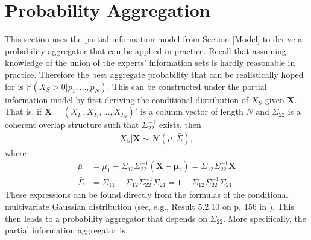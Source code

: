 \documentclass[11pt]{article}
\renewcommand{\P}{\mathbb{P}}
\theoremstyle{definition}
\theoremstyle{definition}
\begin{document}
%
%




\section{Probability Aggregation}
This section uses the partial information model from Section \ref{Model} to derive a probability aggregator that can be applied in practice. Recall that assuming knowledge of the union of the experts' information sets is hardly reasonable in practice. Therefore the best aggregate probability that can be realistically hoped for is  $\P(X_{S} > 0 | p_1, \dots, p_N)$.  This can be constructed under the partial information model by first deriving the conditional distribution of $X_S$ given $\boldsymbol{X}$. That is, if $\boldsymbol{X} = (X_{I_1}, X_{I_2},  \dots, X_{I_N})'$ is a column vector of length $N$ and $\Sigma_{22}$ is a coherent overlap structure such that $\Sigma_{22}^{-1}$ exists, then 
\begin{align*}
X_{S} | \boldsymbol{X} \sim \mathcal{N}(\bar{\mu}, \bar{\Sigma}), 
\end{align*}
where
\begin{align}
\bar{\mu} &= \mu_1 + \Sigma_{12} \Sigma_{22}^{-1} (\boldsymbol{X} - \boldsymbol{\mu}_2) =  \Sigma_{12} \Sigma_{22}^{-1} \boldsymbol{X} \label{condMu}\\
 \bar{\Sigma}&= \Sigma_{11} - \Sigma_{12} \Sigma_{22}^{-1} \Sigma_{21} =1 - \Sigma_{12} \Sigma_{22}^{-1} \Sigma_{21}  \label{condSigma}
\end{align}
These expressions can be found directly from the formulas of the conditional multivariate Gaussian distribution (see, e.g., Result 5.2.10 on p. 156 in \cite{ravishanker2001first}). This then leads to a probability aggregator that depends on $\Sigma_{22}$. More specifically, the partial information aggregator is
\end{document}
